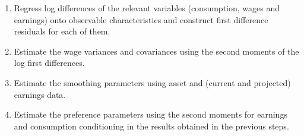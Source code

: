 \documentclass[notes=show]{beamer}
\begin{document}
\begin{frame}%


\begin{enumerate}
\item Regress log differences of the relevant variables (consumption, wages
and earnings) onto observable characteristics and construct first difference
residuals for each of them.

\item Estimate the wage variances and covariances using the second moments
of the log first differences.

\item Estimate the smoothing parameters using asset and (current and
projected) earnings data.

\item Estimate the preference parameters using the second moments for
earnings and consumption conditioning in the results obtained in the
previous steps.
\end{enumerate}

\transboxout%
\end{frame}%

\bigskip

\begin{frame}%


\begin{center}
\textbf{}
\end{center}

\transboxout%
\end{frame}%
\end{document}
